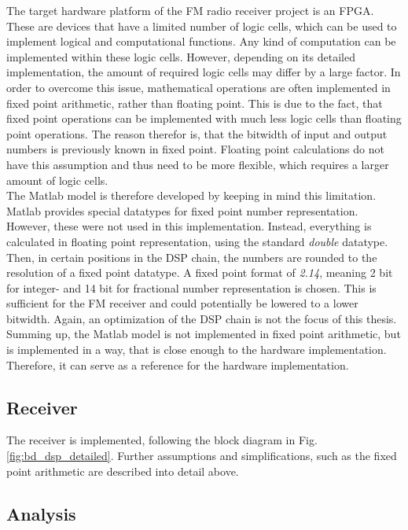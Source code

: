 The target hardware platform of the FM radio receiver project is an FPGA.
These are devices that have a limited number of logic cells, which can be used to implement logical and computational functions.
Any kind of computation can be implemented within these logic cells.
However, depending on its detailed implementation, the amount of required logic cells may differ by a large factor.
In order to overcome this issue, mathematical operations are often implemented in fixed point arithmetic, rather than floating point.
This is due to the fact, that fixed point operations can be implemented with much less logic cells than floating point operations.
The reason therefor is, that the bitwidth of input and output numbers is previously known in fixed point.
Floating point calculations do not have this assumption and thus need to be more flexible, which requires a larger amount of logic cells.\\

The Matlab model is therefore developed by keeping in mind this limitation.
Matlab provides special datatypes for fixed point number representation.
However, these were not used in this implementation.
Instead, everything is calculated in floating point representation, using the standard \textit{double} datatype.
Then, in certain positions in the DSP chain, the numbers are rounded to the resolution of a fixed point datatype.
A fixed point format of \textit{2.14}, meaning 2 bit for integer- and 14 bit for fractional number representation is chosen.
This is sufficient for the FM receiver and could potentially be lowered to a lower bitwidth.
Again, an optimization of the DSP chain is not the focus of this thesis.\\

Summing up, the Matlab model is not implemented in fixed point arithmetic, but is implemented in a way, that is close enough to the hardware implementation.
Therefore, it can serve as a reference for the hardware implementation.


\subsection{Receiver}

The receiver is implemented, following the block diagram in Fig.\ref{fig:bd_dsp_detailed}.
Further assumptions and simplifications, such as the fixed point arithmetic are described into detail above.

\subsection{Analysis}

